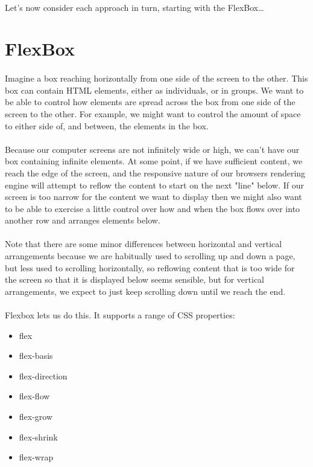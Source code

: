 \paragraph{} Let's now consider each approach in turn, starting with the FlexBox\dots



\section{FlexBox}
\paragraph{} Imagine a box reaching horizontally from one side of the screen to the other. This box can contain HTML elements, either as individuals, or in groups. We want to be able to control how elements are spread across the box from one side of the screen to the other. For example, we might want to control the amount of space to either side of, and between, the elements in the box.
\paragraph{} Because our computer screens are not infinitely wide or high, we can't have our box containing infinite elements. At some point, if we have sufficient content, we reach the edge of the screen, and the responsive nature of our browsers rendering engine will attempt to reflow the content to start on the next "line" below. If our screen is too narrow for the content we want to display then we might also want to be able to exercise a little control over how and when the box flows over into another row and arranges elements below.
\paragraph{} Note that there are some minor differences between horizontal and vertical arrangements because we are habitually used to scrolling up and down a page, but less used to scrolling horizontally, so reflowing content that is too wide for the screen so that it is displayed below seems sensible, but for vertical arrangements, we expect to just keep scrolling down until we reach the end.
\paragraph{} Flexbox lets us do this. It supports a range of CSS properties:

\begin{itemize}
\item flex
\item flex-basis
\item flex-direction
\item flex-flow
\item flex-grow
\item flex-shrink
\item flex-wrap
\end{itemize}

